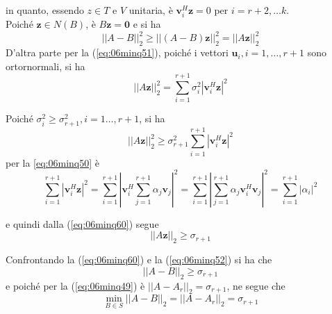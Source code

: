 \begin{thproof}
in quanto, essendo 
$z \in  T$ e $V$ unitaria, \`e $\mathbf{v}_i^{H} 
\mathbf{z} = 0$ per $i = r + 2,\ldots k$. \\
Poich\'e $\mathbf{z} \in N(B)$, \`e $B\mathbf{z}= \mathbf{0}$
e si ha
\begin{equation}
\label{eq:06minq52}
||A - B||_{2}^{2} \geq || (A - B) \mathbf{z}||_{2}^{2} = 
|| A{\mathbf{z}}||_{2}^{2}
\end{equation} 
D'altra parte per la
(\ref{eq:06minq51}), poich\'e i vettori
$\mathbf{u}_{i}, i=1, \ldots, r+1$ sono ortornormali, si ha
\begin{equation}
\label{eq:06minq60}
|| A \mathbf{z}||_{2}^{2} = \displaystyle \sum_{i=1}^{r+1}
\sigma_i^{2} |\mathbf{v}_{i}^{H}\mathbf{z}|^{2}  
\end{equation}

Poich\'e $\sigma_{i}^{2} \geq \sigma^{2}_{r+1},
i =1 \ldots, r+1$, si ha
$$ || A \mathbf{z}||_2^{2} \geq \sigma_{r+1}^{2}
\displaystyle \sum_{i=1}^{r+1} |\mathbf{v}_{i}^{H} \mathbf{z}|^{2}
$$
per la
\ref{eq:06minq50} \`e
$$
\displaystyle \sum_{i=1}^{r+1}
|\mathbf{v}_i^{H} \mathbf{z}|^{2} =
\displaystyle \sum_{i=1}^{r+1}
\left|
\mathbf{v}_{i}^{H} \displaystyle \sum_{j=1}^{r+1}
\alpha_j \mathbf{v}_j
\right|^{2}
= \displaystyle \sum_{i=1}^{r+1}
\left|
\displaystyle \sum_{j=1}^{r+1} \alpha_j
\mathbf{v}_{i}^{H} 
 \mathbf{v}_{j}
\right|^{2}
=
\displaystyle
\sum_{i=1}^{r+1}|\alpha_i|^{2}
$$

e quindi dalla (\ref{eq:06minq60}) segue
\begin{equation}
  \label{eq:06minq61}
   || A\mathbf{z}||_{2} \geq \sigma_{r+1}
\end{equation}

Confrontando la 
 (\ref{eq:06minq60}) e
la (\ref{eq:06minq52})
si ha che
$$
|| A - B||_{2} \geq \sigma_{r+1}
$$
e poich\'e per la 
(\ref{eq:06minq49})
\`e $||A-A_{r}||_{2} = \sigma_{r+1}$, ne segue che
$$
\min_{B \in S} ||A - B||_{2} = ||A - A_r||_2 = \sigma_{r+1}
$$
\end{thproof}

